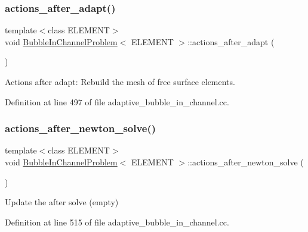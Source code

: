 \subsubsection{\texorpdfstring{actions\+\_\+after\+\_\+adapt()}{actions\_after\_adapt()}}
{\footnotesize\ttfamily template$<$class E\+L\+E\+M\+E\+NT$>$ \\
void \hyperlink{classBubbleInChannelProblem}{Bubble\+In\+Channel\+Problem}$<$ E\+L\+E\+M\+E\+NT $>$\+::actions\+\_\+after\+\_\+adapt (\begin{DoxyParamCaption}{ }\end{DoxyParamCaption})\hspace{0.3cm}{\ttfamily [inline]}}



Actions after adapt\+: Rebuild the mesh of free surface elements. 



Definition at line 497 of file adaptive\+\_\+bubble\+\_\+in\+\_\+channel.\+cc.

\mbox{\label{classBubbleInChannelProblem_a566685b0a4f5dda91adbf9c781f9eafb}} 
\subsubsection{\texorpdfstring{actions\+\_\+after\+\_\+newton\+\_\+solve()}{actions\_after\_newton\_solve()}}
{\footnotesize\ttfamily template$<$class E\+L\+E\+M\+E\+NT$>$ \\
void \hyperlink{classBubbleInChannelProblem}{Bubble\+In\+Channel\+Problem}$<$ E\+L\+E\+M\+E\+NT $>$\+::actions\+\_\+after\+\_\+newton\+\_\+solve (\begin{DoxyParamCaption}{ }\end{DoxyParamCaption})\hspace{0.3cm}{\ttfamily [inline]}}



Update the after solve (empty) 



Definition at line 515 of file adaptive\+\_\+bubble\+\_\+in\+\_\+channel.\+cc.

\mbox{\label{classBubbleInChannelProblem_aae0753340720453a44622c4dbb8807fb}} 
